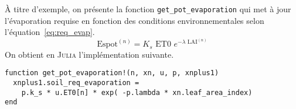 
À titre d'exemple, on présente la fonction \lstinline|get_pot_evaporation| qui met
à jour l'évaporation requise en fonction des conditions environnementales
selon l'équation~\ref{eq:req_evap}.
\begin{equation}
  \text{Espot}^{(n)} = K_s \text{ ET0 } e^{-\lambda \text{ LAI}^{(n)}}
  \label{eq:req_evap}
\end{equation}
On obtient en \textsc{Julia} l'implémentation suivante.
\begin{lstlisting}
function get_pot_evaporation!(n, xn, u, p, xnplus1)
  xnplus1.soil_req_evaporation = 
    p.k_s * u.ET0[n] * exp( -p.lambda * xn.leaf_area_index) 
end
\end{lstlisting}



